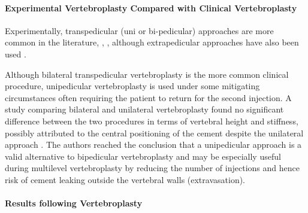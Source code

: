 \paragraph{Experimental Vertebroplasty Compared with Clinical
Vertebroplasty
}\label{experimental-vertebroplasty-compared-with-clinical-vertebroplasty}

Experimentally, transpedicular (uni or bi-pedicular) approaches are more
common in the literature\cite{furtado2007biomechanical},
\cite{ananthakrishnan2005effect}, \cite{pneumaticos2013effect},
although
extrapedicular approaches have also been used \cite{furtado2007biomechanical}.

Although bilateral transpedicular vertebroplasty is the more common clinical
procedure\cite{tohmeh1999biomechanical}, unipedicular vertebroplasty is used
under some
mitigating circumstances often requiring the patient to return for the
second injection. A study comparing bilateral and unilateral
vertebroplasty found no significant difference between the two
procedures in terms of vertebral height and stiffness, possibly
attributed to the central positioning of the cement despite the
unilateral approach \cite{tohmeh1999biomechanical}. The authors reached the
conclusion that a
unipedicular approach is a valid alternative to bipedicular
vertebroplasty and may be especially useful during multilevel
vertebroplasty by reducing the number of injections and hence risk of
cement leaking outside the vertebral walls (extravasation).

\paragraph{Results following Vertebroplasty
}\label{results-following-vertebroplasty}

